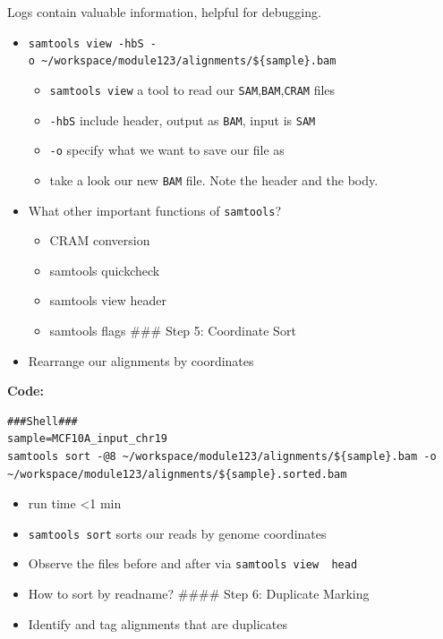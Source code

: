 \documentclass[
]{book}
\providecommand{\tightlist}{%
  \setlength{\itemsep}{0pt}\setlength{\parskip}{0pt}}
\begin{document}
Logs contain valuable information, helpful for debugging.

\begin{itemize}
\tightlist
\item
  \texttt{samtools\ view\ -hbS\ -o\ \textasciitilde{}/workspace/module123/alignments/\$\{sample\}.bam}

  \begin{itemize}
  \tightlist
  \item
    \texttt{samtools\ view} a tool to read our \texttt{SAM},\texttt{BAM},\texttt{CRAM} files
  \item
    \texttt{-hbS} include header, output as \texttt{BAM}, input is \texttt{SAM}
  \item
    \texttt{-o} specify what we want to save our file as
  \item
    take a look our new \texttt{BAM} file. Note the header and the body.
  \end{itemize}
\item
  What other important functions of \texttt{samtools}?

  \begin{itemize}
  \tightlist
  \item
    CRAM conversion
  \item
    samtools quickcheck
  \item
    samtools view header
  \item
    samtools flags
    \#\#\# Step 5: Coordinate Sort
  \end{itemize}
\item
  Rearrange our alignments by coordinates
\end{itemize}

\textbf{Code:}

\begin{verbatim}
###Shell###
sample=MCF10A_input_chr19
samtools sort -@8 ~/workspace/module123/alignments/${sample}.bam -o ~/workspace/module123/alignments/${sample}.sorted.bam
\end{verbatim}

\begin{itemize}
\tightlist
\item
  run time \textless1 min
\item
  \texttt{samtools\ sort} sorts our reads by genome coordinates
\item
  Observe the files before and after via \texttt{samtools\ view\ \textbar{}\ head}
\item
  How to sort by readname?
  \#\#\#\# Step 6: Duplicate Marking
\item
  Identify and tag alignments that are duplicates
\end{itemize}
\end{document}
